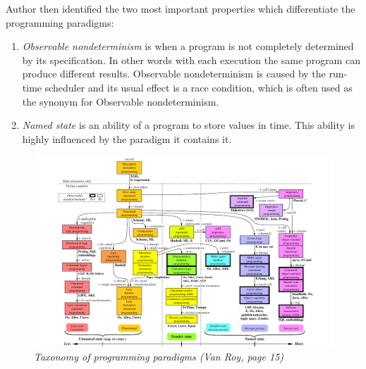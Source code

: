 \documentclass[12pt,twoside,a4paper]{report}
\begin{document}
Author then identified the two most important properties which differentiate the programming paradigms:

\begin{enumerate}\itemsep1pt \parskip0pt 
\item \textit{Observable nondeterminism} is when a program is not completely determined by its specification. In other words with each execution the same program can produce different results. Observable nondeterminism is caused by the run-time scheduler and its usual effect is a race condition, which is often used as the synonym for Observable nondeterminism.
\item \textit{Named state} is an ability of a program to store values in time. This ability is highly influenced by the paradigm it contains it.
\end{enumerate}
\begin{figure}[!hb]
	\centering
		\includegraphics[width=1\textwidth,totalheight=12cm]{taxonomyDiagram}
	\caption{\textit{Taxonomy of programming paradigms (Van Roy, page 15)}}
	\label{f2.1}
\end{figure}
\end{document}
